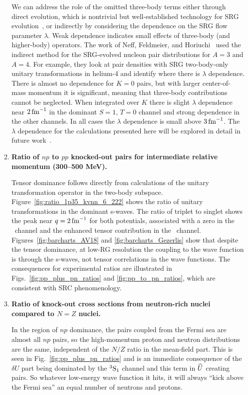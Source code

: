 \documentclass[10pt,aps,prc,floatfix,twocolumn,nofootinbib]{revtex4-1}
\begin{document}
\begin{enumerate}
   We can address the role of the omitted three-body terms either through direct evolution, which is nontrivial but well-established technology for SRG evolution~\cite{Jurgenson:2009qs}, or indirectly by considering the dependence on the SRG flow parameter $\lambda$. Weak dependence indicates small effects of three-body (and higher-body) operators.
   The work of Neff, Feldmeier, and Horiuchi~\cite{Neff:2015xda} used the indirect method for the SRG-evolved nucleon pair distributions for $A=3$ and $A=4$. 
   For example, they look at pair densities with SRG two-body-only unitary transformations in helium-4 and identify where there is $\lambda$ dependence. 
    There is almost no dependence for $K=0$ pairs, but with larger center-of-mass momentum it is significant, meaning that three-body contributions cannot be neglected.
    When integrated over $K$ there is slight $\lambda$ dependence near $2\,\mbox{fm}^{-1}$ in the dominant $S=1,\,T=0$ channel and strong dependence in the other channels. 
    In all cases the $\lambda$ dependence is small above $3\,\mbox{fm}^{-1}$.
   The $\lambda$ dependence for the calculations presented here will be explored in detail in future work~\cite{Tropiano:2021prep}.

  \item \textbf{Ratio of $np$ to $pp$ knocked-out pairs for intermediate relative momentum (300--500 MeV).}

    Tensor dominance follows directly from calculations of the unitary transformation operator in the two-body subspace.
    Figure~\ref{fig:ratio_1p35_kvnn_6_222} shows the ratio of unitary transformations in the dominant s-waves. 
    The ratio of triplet to singlet shows the peak near $q = 2\,\mbox{fm}^{-1}$ for both potentials, associated with a zero in the \singletS\ channel and the enhanced tensor contribution in the \tripletS\ channel.
    Figures~\ref{fig:barcharts_AV18} and \ref{fig:barcharts_Gezerlis} show that despite the tensor dominance, at low-RG resolution the coupling to the wave function is through the s-waves, not tensor correlations in the wave functions.
    The consequences for experimental ratios are illustrated in Figs.~\ref{fig:pp_plus_pn_ratios} and \ref{fig:pp_to_pn_ratios}, which are consistent with SRC phenomenology.

   \item \textbf{Ratio of knock-out cross sections from neutron-rich nuclei compared to $N=Z$ nuclei.}

    In the region of $np$ dominance, the pairs coupled from the Fermi sea are almost all $np$ pairs, so the high-momentum proton and neutron distributions are the same, independent of the $N/Z$ ratio in the mean-field part.
    This is seen in Fig.~\ref{fig:pp_plus_pn_ratios} and is an immediate consequence of the $\delta U$ part being dominated by the $^3\mbox{S}_1$ channel and this term in $\widehat U$ creating pairs. 
    So whatever low-energy wave function it hits, it will always ``kick above the Fermi sea'' an equal number of neutrons and protons.


\end{enumerate}
\end{document}
